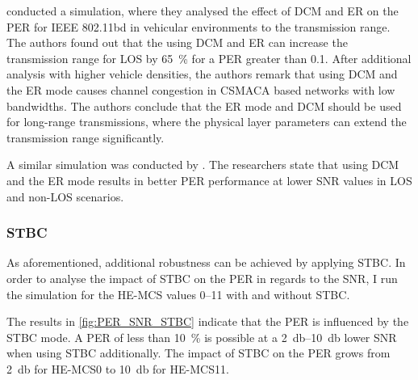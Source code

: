 \textcite{jacob_system-level_2020} conducted a simulation, where they analysed the effect of \ac{DCM} and \ac{ER} on the \ac{PER} for
IEEE 802.11bd in vehicular environments to the transmission range. The authors found out that the using \ac{DCM} and \ac{ER} can
increase the transmission range for \ac{LOS} by \SI{65}{\percent} for a \ac{PER} greater than \num{0.1}. After additional analysis with higher
vehicle densities, the authors remark that using \ac{DCM} and the \ac{ER} mode causes channel congestion in \ac{CSMACA} based
networks with low bandwidths. The authors conclude that the \ac{ER} mode and \ac{DCM} should be used for long-range transmissions, where
the physical layer parameters can extend the transmission range significantly.

A similar simulation was conducted by \textcite{triwinarko_phy_2021}. The researchers state that using \ac{DCM} and the
\ac{ER} mode results in better \ac{PER} performance at lower \ac{SNR} values in \ac{LOS} and non-\ac{LOS} scenarios.

\subsubsection*{\acf{STBC}}
As aforementioned, additional robustness can be achieved by applying \ac{STBC}. In order to analyse the impact of \ac{STBC} on the \ac{PER} in regards to the \ac{SNR},
I run the simulation for the HE-MCS values \numrange{0}{11} with and without \ac{STBC}.

The results in \autoref{fig:PER_SNR_STBC} indicate that the \ac{PER} is influenced
by the \ac{STBC} mode. A \ac{PER} of less than \SI{10}{\percent} is possible at a \SIrange{2}{10}{\decibel} lower \ac{SNR} when using \ac{STBC} additionally.
The impact of \ac{STBC} on the \ac{PER} grows from \SI{2}{\decibel} for HE-MCS\num{0} to \SI{10}{\decibel} for HE-MCS\num{11}.

